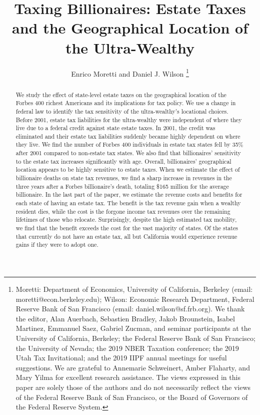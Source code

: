 \documentclass[12pt]{article}
\begin{document}
\title{Taxing Billionaires:  Estate Taxes and the Geographical Location of the Ultra-Wealthy}
	

\author{Enrico Moretti and Daniel J. Wilson \thanks{Moretti: Department of Economics, University of California, Berkeley (email: moretti@econ.berkeley.edu); Wilson: Economic Research Department, Federal Reserve Bank of San Francisco (email: daniel.wilson@sf.frb.org). We thank the editor, Alan Auerbach, Sebastien Bradley, Jakob Brounstein, Isabel Martinez, Emmanuel Saez, Gabriel Zucman, and seminar participants at the University of California, Berkeley; the Federal Reserve Bank of San Francisco; the University of Nevada; the 2019 NBER Taxation conference; the 2019 Utah Tax Invitational; and the 2019 IIPF annual meetings for useful suggestions. We are grateful to Annemarie Schweinert, Amber Flaharty, and Mary Yilma for excellent research assistance. The views expressed in this paper are solely those of the authors and do not necessarily reflect the views of the Federal Reserve Bank of San Francisco, or the Board of Governors of the Federal Reserve System.}}
\maketitle


\begin{abstract} 
\smaller

We  study the effect of state-level estate taxes on the geographical location of the Forbes 400 richest Americans and its implications for tax policy. We use a change in federal law to identify the tax sensitivity of the ultra-wealthy's locational choices. 
Before 2001, estate tax liabilities for the ultra-wealthy were independent of where they live due to a federal credit against state estate taxes. In 2001, the credit was eliminated and their estate tax liabilities suddenly became highly dependent on where they live.
We find the number of Forbes 400 individuals in estate tax states fell by 35\% after 2001 compared to non-estate tax states. We also find that billionaires' sensitivity to the estate tax increases significantly with age. 
Overall,  billionaires’ geographical location appears to be highly sensitive to  estate taxes. 
When we estimate the effect of billionaire deaths on state tax revenues, we find a sharp increase in  revenues in the three years after a Forbes billionaire's death, totaling \$165 million for the average billionaire. 
In the last part of the paper, we estimate the revenue costs and benefits for each state of having an estate tax.
The benefit is the tax revenue gain when a wealthy resident dies, while the cost is the forgone income tax revenues over the remaining lifetimes of those who relocate. 
Surprisingly, despite the high estimated tax mobility, we find that  the benefit exceeds the cost for the vast majority of states. 
Of the states that currently do not have an estate tax, all but California would experience revenue gains if they were to adopt one. 
\end{abstract}
\end{document}

